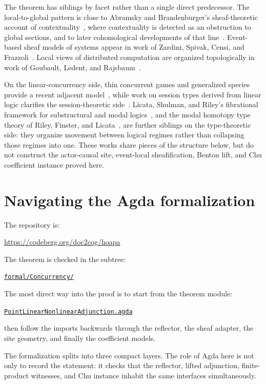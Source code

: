 \documentclass[11pt]{article}
\newcommand{\RepoURL}{https://codeberg.org/doc2cog/hoapa/src/branch/main}
\newcommand{\RepoDir}[1]{\href{\RepoURL/#1}{\nolinkurl{#1/}}}
\newcommand{\RepoFile}[2]{\href{\RepoURL/#1}{\nolinkurl{#2}}}
\begin{document}
The theorem has siblings by facet rather than a single direct predecessor. The
local-to-global pattern is close to Abramsky and Brandenburger's
sheaf-theoretic account of contextuality~\cite{AbramskyBrandenburger2011},
where contextuality is detected as an obstruction to global sections, and to
later cohomological developments of that line~\cite{AbramskyEtAl2015}.
Event-based sheaf models of systems appear in work of Zardini, Spivak, Censi,
and Frazzoli~\cite{ZardiniEtAl2021}. Local views of distributed computation are
organized topologically in work of Goubault, Ledent, and
Rajsbaum~\cite{GoubaultLedentRajsbaum2018}.

On the linear-concurrency side, thin concurrent games and generalized species
provide a recent adjacent model~\cite{ClairambaultOlimpieriPaquet2023}, while
work on session types derived from linear logic clarifies the session-theoretic
side~\cite{Wadler2014,VanDenHeuvelPerez2024}. Licata, Shulman, and Riley's
fibrational framework for substructural and modal logics~\cite{LSR2017}, and
the modal homotopy type theory of Riley, Finster, and
Licata~\cite{RileyFinsterLicata2021}, are further siblings on the
type-theoretic side: they organize movement between logical regimes rather than
collapsing those regimes into one. These works share pieces of the structure
below, but do not construct the actor-causal site, event-local sheafification,
Benton lift, and Chu coefficient instance proved here.

\section*{Navigating the Agda formalization}

The repository is:
\begin{center}
\url{https://codeberg.org/doc2cog/hoapa}
\end{center}
The theorem is checked in the subtree:
\begin{center}
\RepoDir{formal/Concurrency}
\end{center}
The most direct way into the proof is to start from the theorem module:
\begin{center}
\RepoFile{formal/Concurrency/Hybrid/PointLinearNonlinearAdjunction.agda}{PointLinearNonlinearAdjunction.agda}
\end{center}
then follow the imports backwards through the reflector, the sheaf adapter, the
site geometry, and finally the coefficient models.

The formalization splits into three compact layers. The role of Agda here is
not only to record the statement: it checks that the reflector, lifted
adjunction, finite-product witnesses, and Chu instance inhabit the same
interfaces simultaneously.
\end{document}
